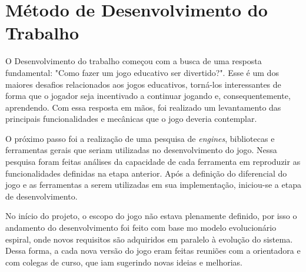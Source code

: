 



\section{Método de Desenvolvimento do Trabalho}
\label{sec-intro-met}
O Desenvolvimento do trabalho começou com a busca de uma resposta fundamental: "Como fazer um jogo educativo ser divertido?". Esse é um dos maiores desafios relacionados aos jogos educativos, torná-los interessantes de forma que o jogador seja incentivado a continuar jogando e, consequentemente, aprendendo. Com essa resposta em mãos, foi realizado um levantamento das principais funcionalidades e mecânicas que o jogo deveria contemplar.

O próximo passo foi a realização de uma pesquisa de \textit{engines}, bibliotecas e ferramentas gerais que seriam utilizadas no desenvolvimento do jogo. Nessa pesquisa foram feitas análises da capacidade de cada ferramenta em reproduzir as funcionalidades definidas na etapa anterior.
Após a definição do diferencial do jogo e as ferramentas a serem utilizadas em sua implementação, iniciou-se a etapa de desenvolvimento.

No início do projeto, o escopo do jogo não estava plenamente definido, por isso o andamento do desenvolvimento foi feito com base mo modelo evolucionário espiral, onde novos requisitos são adquiridos em paralelo à evolução do sistema. Dessa forma, a cada nova versão do jogo eram feitas reuniões com a orientadora e com colegas de curso, que iam sugerindo novas ideias e melhorias.

